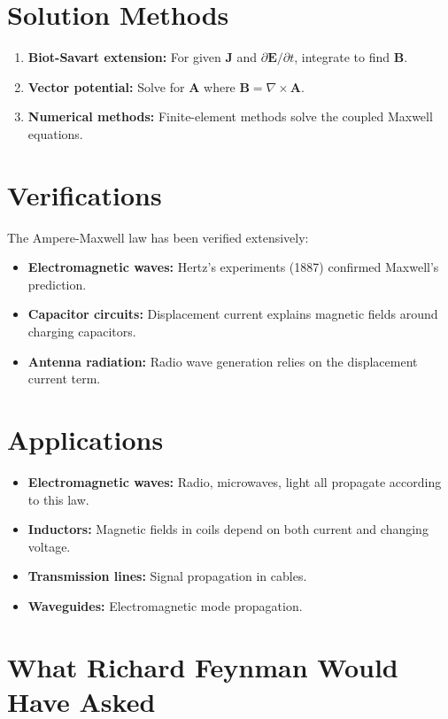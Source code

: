 \section*{Solution Methods}

\begin{enumerate}
\item \textbf{Biot-Savart extension:} For given $\mathbf{J}$ and $\partial \mathbf{E}/\partial t$, integrate to find $\mathbf{B}$.
\item \textbf{Vector potential:} Solve for $\mathbf{A}$ where $\mathbf{B} = \nabla \times \mathbf{A}$.
\item \textbf{Numerical methods:} Finite-element methods solve the coupled Maxwell equations.
\end{enumerate}

\section*{Verifications}

The Ampere-Maxwell law has been verified extensively:

\begin{itemize}
\item \textbf{Electromagnetic waves:} Hertz's experiments (1887) confirmed Maxwell's prediction.
\item \textbf{Capacitor circuits:} Displacement current explains magnetic fields around charging capacitors.
\item \textbf{Antenna radiation:} Radio wave generation relies on the displacement current term.
\end{itemize}

\section*{Applications}

\begin{itemize}
\item \textbf{Electromagnetic waves:} Radio, microwaves, light all propagate according to this law.
\item \textbf{Inductors:} Magnetic fields in coils depend on both current and changing voltage.
\item \textbf{Transmission lines:} Signal propagation in cables.
\item \textbf{Waveguides:} Electromagnetic mode propagation.
\end{itemize}

\section*{What Richard Feynman Would Have Asked}

